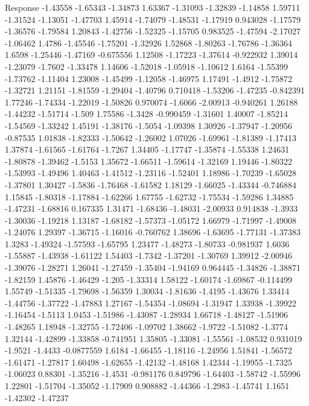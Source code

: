 \documentclass[9pt]{article}
\theoremstyle{plain}
\theoremstyle{definition}
\theoremstyle{remark}
\numberwithin{equation}{section}
\begin{document}
Response
-1.43558
-1.65343
-1.34873
1.63367
-1.31093
-1.32839
-1.14858
1.59711
-1.31524
-1.13051
-1.47703
1.45914
-1.74079
-1.48531
-1.17919
0.943028
-1.17579
-1.36576
-1.79584
1.20843
-1.42756
-1.52325
-1.15705
0.983525
-1.47594
-2.17027
-1.06462
1.4786
-1.45546
-1.75201
-1.32926
1.52868
-1.80263
-1.76786
-1.36364
1.6598
-1.25446
-1.47169
-0.675556
1.12508
-1.17223
-1.37614
-0.922932
1.39014
-1.23079
-1.7602
-1.33478
1.14606
-1.52018
-1.05918
-1.10612
1.6164
-1.55399
-1.73762
-1.11404
1.23008
-1.45499
-1.12058
-1.46975
1.17491
-1.4912
-1.75872
-1.32721
1.21151
-1.81559
-1.29404
-1.40796
0.710418
-1.53206
-1.47235
-0.842391
1.77246
-1.74334
-1.22019
-1.50826
0.970074
-1.6066
-2.00913
-0.940261
1.26188
-1.44232
-1.51714
-1.509
1.75586
-1.3428
-0.990459
-1.31601
1.40007
-1.85214
-1.54569
-1.33242
1.45191
-1.38176
-1.5054
-1.09398
1.30926
-1.37947
-1.20956
-0.87535
1.01838
-1.82333
-1.50642
-1.26002
1.07026
-1.69961
-1.81389
-1.17413
1.37874
-1.61565
-1.61764
-1.7267
1.34405
-1.17747
-1.35874
-1.55338
1.24631
-1.80878
-1.39462
-1.5153
1.35672
-1.66511
-1.59614
-1.32169
1.19446
-1.80322
-1.53993
-1.49496
1.40463
-1.41512
-1.23116
-1.52401
1.18986
-1.70239
-1.65028
-1.37801
1.30427
-1.5836
-1.76468
-1.61582
1.18129
-1.66025
-1.43344
-0.746884
1.15845
-1.80318
-1.17884
-1.62266
1.67755
-1.62732
-1.75534
-1.59286
1.34885
-1.47231
-1.68816
0.167335
1.31471
-1.68436
-1.48031
-2.00933
0.914838
-1.3933
-1.30036
-1.19218
1.13187
-1.68182
-1.57373
-1.05172
1.66979
-1.71997
-1.49008
-1.24076
1.29397
-1.36715
-1.16016
-0.760762
1.38696
-1.63695
-1.77131
-1.37383
1.3283
-1.49324
-1.57593
-1.65795
1.23477
-1.48273
-1.80733
-0.981937
1.6036
-1.55887
-1.43938
-1.61122
1.54403
-1.7342
-1.37201
-1.30769
1.39912
-2.00946
-1.39076
-1.28271
1.26041
-1.27459
-1.35404
-1.94169
0.964445
-1.34826
-1.38871
-1.82159
1.45876
-1.46429
-1.205
-1.33314
1.58122
-1.60174
-1.69867
-0.114499
1.55749
-1.51335
-1.79698
-1.56359
1.30034
-1.81636
-1.4195
-1.43676
1.33414
-1.44756
-1.37722
-1.47883
1.27167
-1.54354
-1.08694
-1.31947
1.33938
-1.39922
-1.16454
-1.5113
1.0453
-1.51986
-1.43087
-1.28934
1.66718
-1.48127
-1.51906
-1.48265
1.18948
-1.32755
-1.72406
-1.09702
1.38662
-1.9722
-1.51082
-1.3774
1.32144
-1.42899
-1.33858
-0.741951
1.35805
-1.33081
-1.55561
-1.08532
0.931019
-1.9521
-1.4433
-0.0877559
1.6184
-1.66455
-1.18116
-1.24956
1.51841
-1.56572
-1.61471
-1.27817
1.60498
-1.62655
-1.42132
-1.48168
1.42344
-1.19955
-1.7325
-1.06023
0.88301
-1.35216
-1.4531
-0.981176
0.849796
-1.64403
-1.58742
-1.55996
1.22801
-1.51704
-1.35052
-1.17909
0.908882
-1.44366
-1.2983
-1.45741
1.1651
-1.42302
-1.47237
\end{document}
